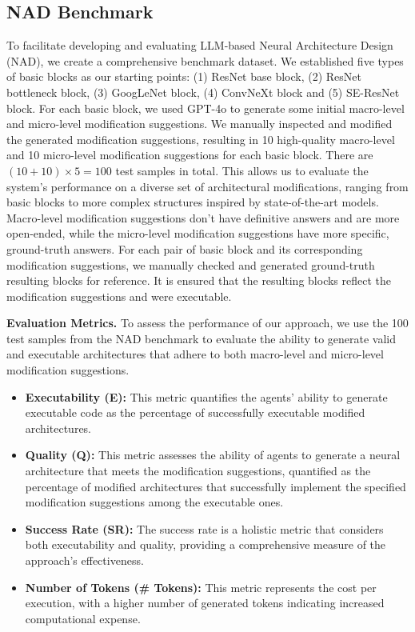 \subsection{NAD Benchmark}
To facilitate developing and evaluating LLM-based Neural Architecture Design (NAD), we create a comprehensive benchmark dataset. 
We established five types of basic blocks as our starting points: (1) ResNet base block, (2) ResNet bottleneck block, (3) GoogLeNet block, (4) ConvNeXt block and (5) SE-ResNet block. For each basic block, we used GPT-4o to generate some initial macro-level and micro-level modification suggestions. 
We manually inspected and modified the generated modification suggestions, resulting in 10 high-quality macro-level and 10 micro-level modification suggestions for each basic block. There are $(10+10) \times 5 = 100$ test samples in total.
This allows us to evaluate the system's performance on a diverse set of architectural modifications, ranging from basic blocks to more complex structures inspired by state-of-the-art models. Macro-level modification suggestions don't have definitive answers and are more open-ended, while the micro-level modification suggestions have more specific, ground-truth answers. 
For each pair of basic block and its corresponding modification suggestions, we manually checked and generated ground-truth resulting blocks for reference. It is ensured that the resulting blocks reflect the modification suggestions and were executable.

\textbf{Evaluation Metrics.} To assess the performance of our approach, we use the 100 test samples from the NAD benchmark to evaluate the ability to generate valid and executable architectures that adhere to both macro-level and micro-level modification suggestions.
\begin{itemize}
    \item \textbf{Executability (E):} This metric quantifies the agents’ ability to generate executable code as the percentage of successfully executable modified architectures.
    \item \textbf{Quality (Q):} This metric assesses the ability of agents to generate a neural architecture that meets the modification suggestions, quantified as the percentage of modified architectures that successfully implement the specified modification suggestions among the executable ones.
    \item \textbf{Success Rate (SR):} The success rate is a holistic metric that considers both executability and quality, providing a comprehensive measure of the approach's effectiveness.
    \item \textbf{Number of Tokens (\# Tokens):} This metric represents the cost per execution, with a higher number of generated tokens indicating increased computational expense.
\end{itemize}
